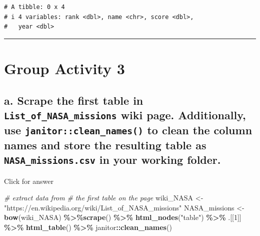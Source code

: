\documentclass[
]{book}
\newenvironment{Shaded}{\begin{snugshade}}{\end{snugshade}}
\newcommand{\CommentTok}[1]{\textcolor[rgb]{0.56,0.35,0.01}{\textit{#1}}}
\newcommand{\DecValTok}[1]{\textcolor[rgb]{0.00,0.00,0.81}{#1}}
\newcommand{\FunctionTok}[1]{\textcolor[rgb]{0.13,0.29,0.53}{\textbf{#1}}}
\newcommand{\NormalTok}[1]{#1}
\newcommand{\OtherTok}[1]{\textcolor[rgb]{0.56,0.35,0.01}{#1}}
\newcommand{\SpecialCharTok}[1]{\textcolor[rgb]{0.81,0.36,0.00}{\textbf{#1}}}
\newcommand{\StringTok}[1]{\textcolor[rgb]{0.31,0.60,0.02}{#1}}
\begin{document}
\begin{verbatim}
# A tibble: 0 x 4
# i 4 variables: rank <dbl>, name <chr>, score <dbl>,
#   year <dbl>
\end{verbatim}

\begin{center}\rule{0.5\linewidth}{0.5pt}\end{center}

\hypertarget{group-activity-3-1}{%
\section{Group Activity 3}\label{group-activity-3-1}}

\hypertarget{a.-scrape-the-first-table-in-list_of_nasa_missions-wiki-page.-additionally-use-janitorclean_names-to-clean-the-column-names-and-store-the-resulting-table-as-nasa_missions.csv-in-your-working-folder.}{%
\subsection{\texorpdfstring{a. Scrape the first table in \texttt{List\_of\_NASA\_missions} wiki page. Additionally, use \texttt{janitor::clean\_names()} to clean the column names and store the resulting table as \texttt{NASA\_missions.csv} in your working folder.}{a. Scrape the first table in List\_of\_NASA\_missions wiki page. Additionally, use janitor::clean\_names() to clean the column names and store the resulting table as NASA\_missions.csv in your working folder.}}\label{a.-scrape-the-first-table-in-list_of_nasa_missions-wiki-page.-additionally-use-janitorclean_names-to-clean-the-column-names-and-store-the-resulting-table-as-nasa_missions.csv-in-your-working-folder.}}

Click for answer

\begin{Shaded}
\begin{Highlighting}[]
\CommentTok{\# extract data from }
\CommentTok{\# the first table on the page}
\NormalTok{wiki\_NASA }\OtherTok{\textless{}{-}} \StringTok{"https://en.wikipedia.org/wiki/List\_of\_NASA\_missions"}
\NormalTok{NASA\_missions }\OtherTok{\textless{}{-}} \FunctionTok{bow}\NormalTok{(wiki\_NASA) }\SpecialCharTok{\%\textgreater{}\%}\FunctionTok{scrape}\NormalTok{() }\SpecialCharTok{\%\textgreater{}\%} 
  \FunctionTok{html\_nodes}\NormalTok{(}\StringTok{"table"}\NormalTok{) }\SpecialCharTok{\%\textgreater{}\%} 
\NormalTok{  .[[}\DecValTok{1}\NormalTok{]] }\SpecialCharTok{\%\textgreater{}\%} 
  \FunctionTok{html\_table}\NormalTok{() }\SpecialCharTok{\%\textgreater{}\%} 
\NormalTok{  janitor}\SpecialCharTok{::}\FunctionTok{clean\_names}\NormalTok{()}
\end{Highlighting}
\end{Shaded}
\end{document}
